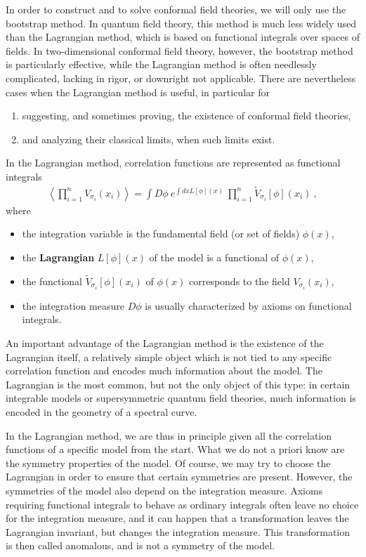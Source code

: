 \documentclass[12pt,a4paper,notitlepage]{report}
\newcommand \la {\left\langle}
\newcommand \ra {\right\rangle}
\numberwithin{equation}{section}
\newcommand{\term}[1]{\textbf{\boldmath #1}\index{#1}}
\theoremstyle{break}
\begin{document}
In order to construct and to solve conformal field theories, we will only use the bootstrap method.
In quantum field theory, this method is much less widely used than the Lagrangian method, which is based on functional integrals over spaces of fields.
In two-dimensional conformal field theory, however, the bootstrap method is particularly effective, while the Lagrangian method is often needlessly complicated, lacking in rigor, or downright not applicable. 
There are nevertheless cases when the Lagrangian method is useful, in particular for 
\begin{enumerate}
\item suggesting, and sometimes proving, the existence of conformal field theories,
\item  and analyzing their classical limits, when such limits exist. 
\end{enumerate}

In the Lagrangian method, correlation functions are represented as functional integrals
\begin{align}
 \la\prod_{i=1}^n V_{\sigma_i}(x_i)\ra = \int D\phi\ e^{\int dx L[\phi](x)} \ \prod_{i=1}^n \tilde{V}_{\sigma_i}[\phi](x_i)\ ,
\end{align}
where  
\begin{itemize}
 \item the integration variable is the fundamental field (or set of fields) $\phi(x)$,
\item the \term{Lagrangian} $L[\phi](x)$ of the model is a functional of $\phi(x)$,
\item the functional $\tilde{V}_{\sigma_i}[\phi](x_i)$ of $\phi(x)$ corresponds to the field $ V_{\sigma_i}(x_i)$,
\item the integration measure $D\phi$ is usually characterized by axioms on functional integrals. 
\end{itemize}
An important advantage of the Lagrangian method is the existence of the Lagrangian itself, a relatively simple object which is not tied to any specific correlation function and encodes much information about the model.
The Lagrangian is the most common, but not the only object of this type: in certain integrable models or supersymmetric quantum field theories, much information is encoded in the geometry of a spectral curve.

In the Lagrangian method, we are thus in principle given all the correlation functions of a specific model from the start.
What we do not a priori know are the symmetry properties of the model.
Of course, we may try to choose the Lagrangian in order to ensure that certain symmetries are present.
However, the symmetries of the model also depend on the integration measure.
Axioms requiring functional integrals to behave as ordinary integrals often leave no choice for the integration measure, and 
it can happen that a transformation leaves the Lagrangian invariant, but changes the integration measure.
This transformation is then called anomalous, and is not a symmetry of the model.
\end{document}
